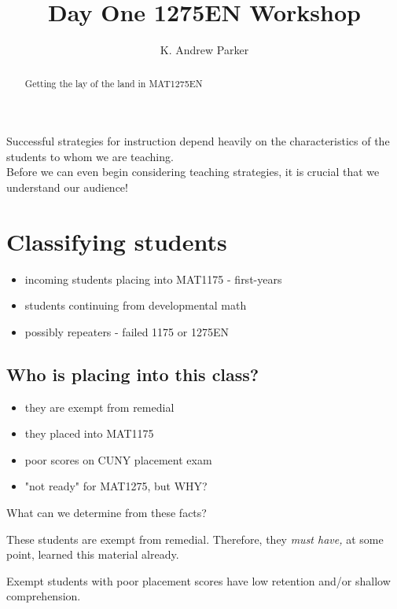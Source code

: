 \documentclass{ximera}
\title{Day One 1275EN Workshop}
\author{K. Andrew Parker}
\begin{document}
\begin{abstract}
Getting the lay of the land in MAT1275EN
\end{abstract}

\maketitle

Successful strategies for instruction depend heavily on the characteristics of the students to whom we are teaching.\\

Before we can even begin considering teaching strategies, it is crucial that we understand our audience! \\


\section{Classifying students}

\begin{itemize}
\item incoming students placing into MAT1175 - first-years
\item students continuing from developmental math
\item possibly repeaters - failed 1175 or 1275EN
\end{itemize}

\subsection{Who is placing into this class?}

\begin{itemize}
\item they are exempt from remedial
\item they placed into MAT1175
\item poor scores on CUNY placement exam
\item "not ready" for MAT1275, but WHY?
\end{itemize}

What can we determine from these facts?

\begin{lemma}
These students are exempt from remedial. Therefore, they \emph{must have,} at some point, learned this material already.
\end{lemma}

\begin{lemma}
Exempt students with poor placement scores have low retention and/or shallow comprehension.
\end{lemma}
\end{document}
